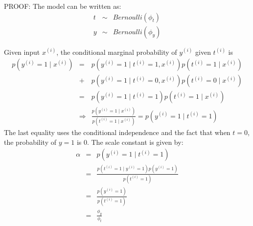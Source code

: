 \begin{answer}

PROOF: The model can be written as:
\begin{eqnarray*}
    t &\sim& Bernoulli(\phi_t) \\
    y &\sim& Bernoulli(\phi_y)
\end{eqnarray*}

Given input $x^{(i)}$, the conditional marginal probability of $y^{(i)}$ given $t^{(i)}$ is
\begin{eqnarray*}
p(y^{(i)} = 1\mid x^{(i)}) 
    &=& p(y^{(i)} = 1 \mid t^{(i)} = 1, x^{(i)}) p(t^{(i)} = 1\mid x^{(i)}) \\
    &+& p(y^{(i)} = 1 \mid t^{(i)} = 0, x^{(i)}) p(t^{(i)} = 0\mid x^{(i)}) \\
    &=& p(y^{(i)} = 1 \mid t^{(i)} = 1) p(t^{(i)} = 1\mid x^{(i)}) \\
    &\Rightarrow& \frac{p(y^{(i)} = 1\mid x^{(i)}) } {p(t^{(i)} = 1\mid x^{(i)})} = p(y^{(i)} = 1 \mid t^{(i)} = 1)
\end{eqnarray*}
The last equality uses the conditional independence and the fact that when $t=0$, the probability of $y=1$ is 0. The scale constant
is given by:
\begin{eqnarray*}
\alpha 
    &=& p(y^{(i)} = 1 \mid t^{(i)} = 1) \\
    &=& \frac{p(t^{(i)} = 1 \mid y^{(i)} = 1) p(y^{(i)} = 1)}{p(t^{(i)} = 1)} \\
    &=& \frac{p(y^{(i)} = 1)}{p(t^{(i)} = 1)} \\
    &=& \frac{\phi_y}{\phi_t} 
\end{eqnarray*}

\end{answer}
